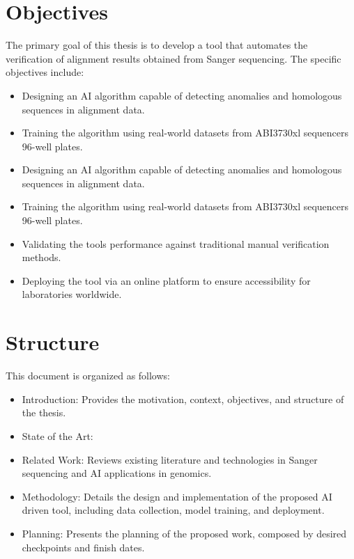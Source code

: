 \section{Objectives}
\label{sec:Objectives}

The primary goal of this thesis is to develop a tool that automates the verification of alignment results obtained from Sanger sequencing. The specific objectives include:

\begin{itemize}
  \item Designing an AI algorithm capable of detecting anomalies and homologous sequences in alignment data.
  \item Training the algorithm using real-world datasets from ABI3730xl sequencers 96-well plates.
  \item Designing an AI algorithm capable of detecting anomalies and homologous sequences in alignment data.
  \item Training the algorithm using real-world datasets from ABI3730xl sequencers 96-well plates.
  \item Validating the tools performance against traditional manual verification methods.
  \item Deploying the tool via an online platform to ensure accessibility for laboratories worldwide.
\end{itemize}

\section{Structure}
\label{sec:Structure}

This document is organized as follows:

\begin{itemize}
  \item Introduction: Provides the motivation, context, objectives, and structure of the thesis.
  \item State of the Art: 
  \item Related Work: Reviews existing literature and technologies in Sanger sequencing and AI applications in genomics.
  \item Methodology: Details the design and implementation of the proposed AI driven tool, including data collection, model training, and deployment.
  \item Planning: Presents the planning of the proposed work, composed by desired checkpoints and finish dates.
  \end{itemize}

